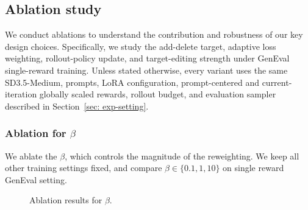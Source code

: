 \documentclass{article} %
\begin{document}
\subsection{Ablation study}



We conduct ablations to understand the contribution and robustness of our key design choices. Specifically, we study the add-delete target, adaptive loss weighting, rollout-policy update, and target-editing strength under GenEval single-reward training. 
Unless stated otherwise, every variant uses the same SD3.5-Medium, prompts, LoRA configuration, prompt-centered and current-iteration globally scaled rewards, rollout
budget, and evaluation sampler described in Section~\ref{sec: exp-setting}. 




\subsubsection{Ablation for $\beta$}

We ablate the $\beta$, which controls the magnitude
of the reweighting. We keep all other training
settings fixed, and compare $\beta\in\{0.1,1,10\}$ on single reward GenEval setting. 



\begin{figure}[H]
    \centering
    \caption{Ablation results for $\beta$.}
    \label{fig:ablation-beta}
\end{figure}
\end{document}
